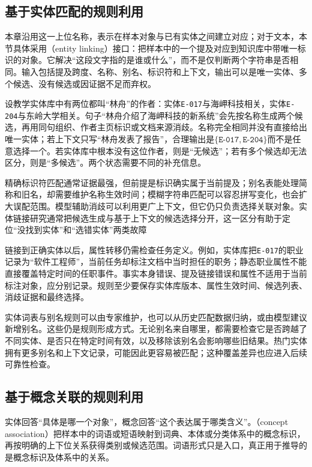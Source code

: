 \subsection{基于实体匹配的规则利用}
\label{sec:rule-based-knowledge-acquisition-entity-matching}

本章沿用这一上位名称，表示在样本对象与已有实体之间建立对应；对于文本，本节具体采用（entity linking）接口：把样本中的一个提及对应到知识库中带唯一标识的对象。它解决“这段文字指的是谁或什么”，而不是仅判断两个字符串是否相同。输入包括提及跨度、名称、别名、标识符和上下文，输出可以是唯一实体、多个候选、没有候选或因证据不足而弃权。

设教学实体库中有两位都叫“林舟”的作者：实体\texttt{E-017}与海岬科技相关，实体\texttt{E-204}与东岭大学相关。句子“林舟介绍了海岬科技的新系统”会先按名称生成两个候选，再用同句组织、作者主页标识或文档来源消歧。名称完全相同并没有直接给出唯一实体；若上下文只写“林舟发表了报告”，合理输出是$\{\texttt{E-017},\texttt{E-204}\}$而不是任意选择一个。若实体库中根本没有这位作者，则是“无候选”；若有多个候选却无法区分，则是“多候选”。两个状态需要不同的补充信息。

精确标识符匹配通常证据最强，但前提是标识确实属于当前提及；别名表能处理简称和旧名，却需要维护名称生效时间；模糊字符串匹配可以容忍拼写变化，也会扩大误配范围。模型辅助消歧可以利用更广上下文，但它仍只负责选择关联对象。实体链接研究通常把候选生成与基于上下文的候选选择分开，这一区分有助于定位“没找到实体”和“选错实体”两类故障

链接到正确实体以后，属性转移仍需检查任务定义。例如，实体库把\texttt{E-017}的职业记录为“软件工程师”，当前任务却标注文档中当时担任的职务；静态职业属性不能直接覆盖特定时间的任职事件。事实本身错误、提及链接错误和属性不适用于当前标注对象，应分别记录。规则至少要保存实体库版本、属性生效时间、候选列表、消歧证据和最终选择。

实体词表与别名规则可以由专家维护，也可以从历史匹配数据归纳，或由模型建议新增别名。这些仍是规则形成方式。无论别名来自哪里，都需要检查它是否跨越了不同实体、是否只在特定时间有效，以及移除该别名会影响哪些旧结果。热门实体拥有更多别名和上下文记录，可能因此更容易被匹配；这种覆盖差异也应进入后续可靠性检查。

\subsection{基于概念关联的规则利用}
\label{sec:rule-based-knowledge-acquisition-concept-association}

实体回答“具体是哪一个对象”，概念回答“这个表达属于哪类含义”。（concept association）把样本中的词语或短语映射到词典、本体或分类体系中的概念标识，再按明确的上下位关系获得类别或候选范围。词语形式只是入口，真正用于推导的是概念标识及体系中的关系。

